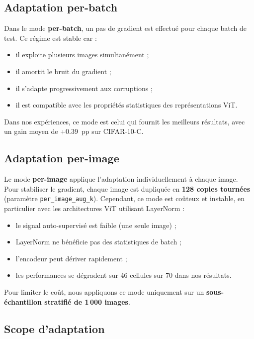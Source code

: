 \documentclass[12pt,a4paper]{report}
\begin{document}
	\subsection{Adaptation per-batch}
	
	Dans le mode \textbf{per-batch}, un pas de gradient est effectué pour chaque batch de test.  
	Ce régime est stable car :
	\begin{itemize}
		\item il exploite plusieurs images simultanément ;
		\item il amortit le bruit du gradient ;
		\item il s’adapte progressivement aux corruptions ;
		\item il est compatible avec les propriétés statistiques des représentations ViT.
	\end{itemize}
	
	Dans nos expériences, ce mode est celui qui fournit les meilleurs résultats, avec un gain moyen de +0.39~pp sur CIFAR-10-C.
	
	\subsection{Adaptation per-image}
	
	Le mode \textbf{per-image} applique l’adaptation individuellement à chaque image.  
	Pour stabiliser le gradient, chaque image est dupliquée en \textbf{128 copies tournées} (paramètre \texttt{per\_image\_aug\_k}).  
	Cependant, ce mode est coûteux et instable, en particulier avec les architectures ViT utilisant LayerNorm :
	\begin{itemize}
		\item le signal auto-supervisé est faible (une seule image) ;
		\item LayerNorm ne bénéficie pas des statistiques de batch ;
		\item l’encodeur peut dériver rapidement ;
		\item les performances se dégradent sur 46 cellules sur 70 dans nos résultats.
	\end{itemize}
	
	Pour limiter le coût, nous appliquons ce mode uniquement sur un \textbf{sous-échantillon stratifié de 1\,000 images}.
	
	\subsection{Scope d’adaptation}
	
\end{document}
